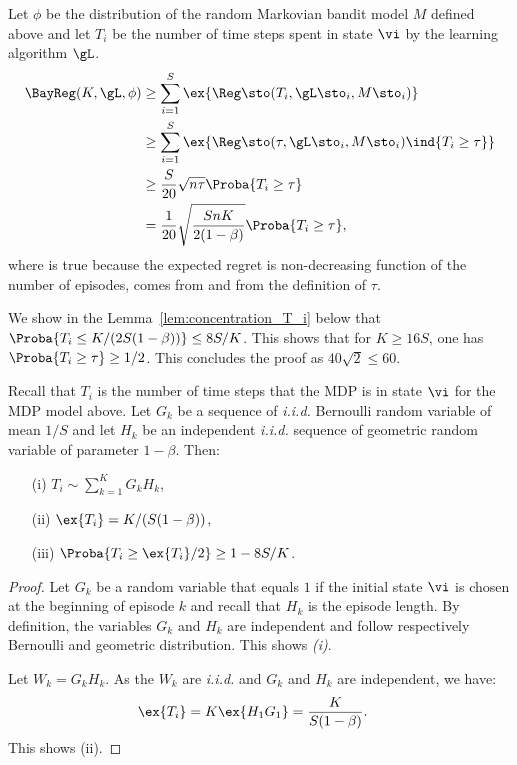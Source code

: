 \begin{subappendices}
Let $\phi$ be the distribution of the random Markovian bandit model $M$ defined above and let $T_i$ be the number of time steps spent in state $\vi$ by the learning algorithm $\gL$.
\begin{align}
    \BayReg(K,\gL, \phi)
    &\ge \sum_{i=1}^S\ex{\Reg\sto(T_i, \gL\sto_i, M\sto_i)} \nonumber\\
    &\ge \sum_{i=1}^S\ex{\Reg\sto(\tau, \gL\sto_i,  M\sto_i)\ind{T_i\ge\tau}}\label{eq:non-decreasing}\\
    &\ge \frac{S}{20} \sqrt{n\tau}\Proba{T_i\ge \tau}\label{eq:lower2}\\
    &= \frac1{20} \sqrt{\frac{SnK}{2(1-\beta)}}\Proba{T_i\ge \tau},\label{eq:tau}
\end{align}
where  is true because the expected regret is non-decreasing function of the number of episodes,  comes from  and  from the definition of $\tau$.

We show in the Lemma~\ref{lem:concentration_T_i} below that $\Proba{T_i\le K/(2S(1-\beta))}\le 8S/K$. This shows that for $K\ge16S$, one has $\Proba{T_i\ge \tau}\ge1/2$. This concludes the proof as $40\sqrt{2}\le60$. 

\begin{lem}
    \label{lem:concentration_T_i}
    Recall that $T_i$ is the number of time steps that the MDP is in state $\vi$ for the MDP model above. Let $G_k$ be a sequence of \emph{i.i.d.} Bernoulli random variable of mean $1/S$ and let $H_k$ be an independent \emph{i.i.d.} sequence of geometric random variable of parameter $1-\beta$. Then:
    \begin{itemize}
        \item[(i)] $T_i\sim\sum_{k=1}^K G_k H_k$,
        \item[(ii)] $\ex{T_i} = K/(S(1-\beta))$,
        \item[(iii)] $\Proba{T_i \ge \ex{T_i}/2} \ge 1-8S/K$. 
    \end{itemize}
\end{lem}
\begin{proof}
    Let $G_k$ be a random variable that equals $1$ if the initial state $\vi$ is chosen at the beginning of episode $k$ and recall that $H_k$ is the episode length. By definition, the variables $G_k$ and $H_k$ are independent and follow respectively Bernoulli and geometric distribution. This shows \emph{(i)}. 
    
    Let $W_k=G_kH_k$. As the $W_k$ are \emph{i.i.d.} and $G_k$ and $H_k$ are independent, we have: 
    \begin{align*}
        \ex{T_i} = K\ex{H_1G_1} &= \frac{K}{S(1-\beta)}.
    \end{align*}
    This shows (ii). 
    

\end{proof}
\end{subappendices}
